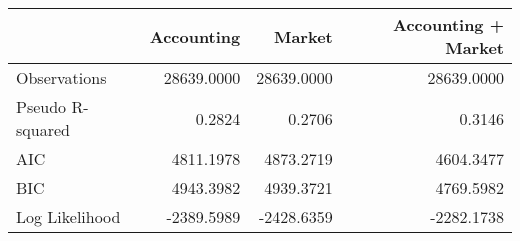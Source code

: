 \begin{tabular}{lrrr}
\toprule
 & Accounting & Market & Accounting + Market \\
\midrule
Observations & 28639.0000 & 28639.0000 & 28639.0000 \\
Pseudo R-squared & 0.2824 & 0.2706 & 0.3146 \\
AIC & 4811.1978 & 4873.2719 & 4604.3477 \\
BIC & 4943.3982 & 4939.3721 & 4769.5982 \\
Log Likelihood & -2389.5989 & -2428.6359 & -2282.1738 \\
\bottomrule
\end{tabular}
